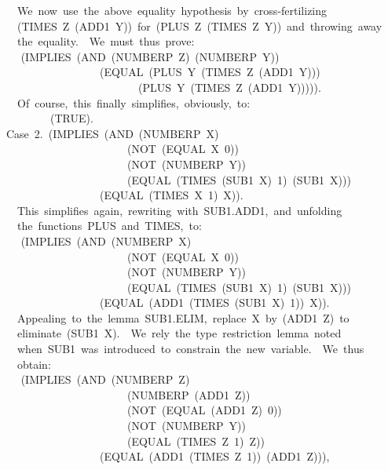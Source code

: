 \documentclass[10pt]{book}
\newenvironment{pubasis}{\begin{flushleft}}{\end{flushleft}}
\begin{document}
\begin{pubasis}
~~~~We~now~use~the~above~equality~hypothesis~by~cross-fertilizing\\
~~~~(TIMES~Z~(ADD1~Y))~for~(PLUS~Z~(TIMES~Z~Y))~and~throwing~away\\
~~~~the~equality.~~We~must~thus~prove:\\

~~	~~(IMPLIES~(AND~(NUMBERP~Z)~(NUMBERP~Y))\\
~~~~~~~~~~~~~~~~~~~(EQUAL~(PLUS~Y~(TIMES~Z~(ADD1~Y)))\\
~~~~~~~~~~~~~~~~~~~~~~~~~~(PLUS~Y~(TIMES~Z~(ADD1~Y))))).\\

~~~~Of~course,~this~finally~simplifies,~obviously,~to:\\

~~~~~~~~~~(TRUE).\\

~~Case~2.~(IMPLIES~(AND~(NUMBERP~X)\\
~~~~~~~~~~~~~~~~~~~~~~~~(NOT~(EQUAL~X~0))\\
~~~~~~~~~~~~~~~~~~~~~~~~(NOT~(NUMBERP~Y))\\
~~~~~~~~~~~~~~~~~~~~~~~~(EQUAL~(TIMES~(SUB1~X)~1)~(SUB1~X)))\\
~~~~~~~~~~~~~~~~~~~(EQUAL~(TIMES~X~1)~X)).\\

~~~~This~simplifies~again,~rewriting~with~SUB1.ADD1,~and~unfolding\\
~~~~the~functions~PLUS~and~TIMES,~to:\\

~~	~~(IMPLIES~(AND~(NUMBERP~X)\\
~~~~~~~~~~~~~~~~~~~~~~~~(NOT~(EQUAL~X~0))\\
~~~~~~~~~~~~~~~~~~~~~~~~(NOT~(NUMBERP~Y))\\
~~~~~~~~~~~~~~~~~~~~~~~~(EQUAL~(TIMES~(SUB1~X)~1)~(SUB1~X)))\\
~~~~~~~~~~~~~~~~~~~(EQUAL~(ADD1~(TIMES~(SUB1~X)~1))~X)).\\

~~~~Appealing~to~the~lemma~SUB1.ELIM,~replace~X~by~(ADD1~Z)~to\\
~~~~eliminate~(SUB1~X).~~We~rely~the~type~restriction~lemma~noted\\
~~~~when~SUB1~was~introduced~to~constrain~the~new~variable.~~We~thus\\
~~~~obtain:\\

~~	~~(IMPLIES~(AND~(NUMBERP~Z)\\
~~~~~~~~~~~~~~~~~~~~~~~~(NUMBERP~(ADD1~Z))\\
~~~~~~~~~~~~~~~~~~~~~~~~(NOT~(EQUAL~(ADD1~Z)~0))\\
~~~~~~~~~~~~~~~~~~~~~~~~(NOT~(NUMBERP~Y))\\
~~~~~~~~~~~~~~~~~~~~~~~~(EQUAL~(TIMES~Z~1)~Z))\\
~~~~~~~~~~~~~~~~~~~(EQUAL~(ADD1~(TIMES~Z~1))~(ADD1~Z))),\\


\end{pubasis}
\end{document}
